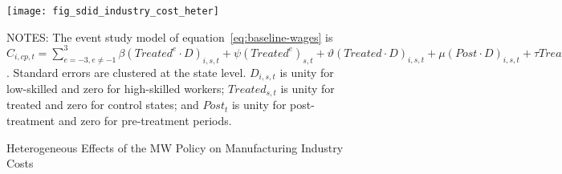 \begin{figure}[H]
    \centering
    \texttt{[image: fig\_sdid\_industry\_cost\_heter]}
    \caption{Heterogeneous Effects of the MW Policy on Manufacturing Industry Costs}
    \label{fig:baseline-manufacturing-industry-cost-heter}
    \begin{minipage}{\columnwidth}
        \vspace{0.05in}
        \tiny NOTES: The event study model of equation~\ref{eq:baseline-wages} is $C_{i,cp,t} = \sum_{{e = -3},{e \neq -1}}^{3} \beta (Treated^{e} \cdot D)_{i,s,t} + \psi (Treated^{e})_{s,t} + \vartheta (Treated \cdot D)_{i,s,t} + \mu (Post \cdot D)_{i,s,t} + \tau Treated_{s,t} + \rho D_{i,s,t} + \alpha Post_{t} + \delta X_{v,c,t-1} + \omega F_{f,t} + \lambda_{t} + \sigma_{c} + \phi_{cp} + \zeta_{cp,t} + \epsilon_{i,cp,t}$. Standard errors are clustered at the state level. $D_{i,s,t}$ is unity for low-skilled and zero for high-skilled workers; $Treated_{s,t}$ is unity for treated and zero for control states; and $Post_{t}$ is unity for post-treatment and zero for pre-treatment periods.
    \end{minipage}
\end{figure}

